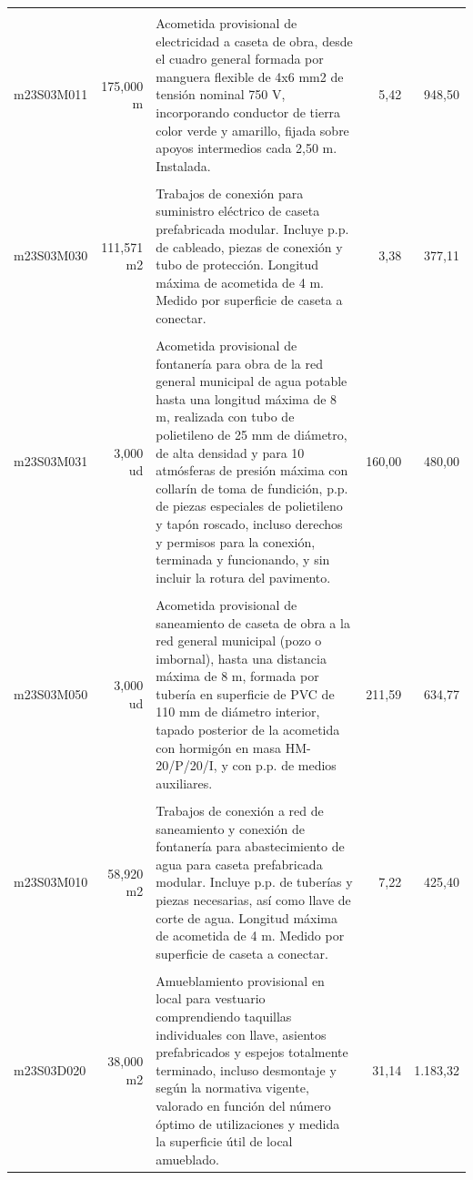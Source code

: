 \documentclass{book}%
\begin{document}
\begin{longtable}{lrlrr}
&&&&\\%
m23S03M011&   175,000 m&\multicolumn{1}{p{5cm}}{Acometida provisional de electricidad a caseta de obra, desde el cuadro general formada por manguera flexible de 4x6 mm2 de tensión nominal 750 V, incorporando conductor de tierra color verde y amarillo, fijada sobre apoyos intermedios cada 2,50 m. Instalada.}&      5,42&948,50\\%
&&&&\\%
m23S03M030&   111,571 m2&\multicolumn{1}{p{5cm}}{Trabajos de conexión para suministro eléctrico de caseta prefabricada modular. Incluye p.p. de cableado, piezas de conexión y tubo de protección. Longitud máxima de acometida de 4 m. Medido por superficie de caseta a conectar.}&      3,38&377,11\\%
&&&&\\%
m23S03M031&     3,000 ud&\multicolumn{1}{p{5cm}}{Acometida provisional de fontanería para obra de la red general municipal de agua potable hasta una longitud máxima de 8 m, realizada con tubo de polietileno de 25 mm de diámetro, de alta densidad y para 10 atmósferas de presión máxima con collarín de toma de fundición, p.p. de piezas especiales de polietileno y tapón roscado, incluso derechos y permisos para la conexión, terminada y funcionando, y sin incluir la rotura del pavimento.}&    160,00&480,00\\%
&&&&\\%
m23S03M050&     3,000 ud&\multicolumn{1}{p{5cm}}{Acometida provisional de saneamiento de caseta de obra a la red general municipal (pozo o imbornal), hasta una distancia máxima de 8 m, formada por tubería en superficie de PVC de 110 mm de diámetro interior, tapado posterior de la acometida con hormigón en masa HM{-}20/P/20/I, y con p.p. de medios auxiliares.}&    211,59&634,77\\%
&&&&\\%
m23S03M010&    58,920 m2&\multicolumn{1}{p{5cm}}{Trabajos de conexión a red de saneamiento y conexión de fontanería para abastecimiento de agua para caseta prefabricada modular. Incluye p.p. de tuberías y piezas necesarias, así como llave de corte de agua. Longitud máxima de acometida de 4 m. Medido por superficie de caseta a conectar.}&      7,22&425,40\\%
&&&&\\%
m23S03D020&    38,000 m2&\multicolumn{1}{p{5cm}}{Amueblamiento provisional en local para vestuario comprendiendo taquillas individuales con llave, asientos prefabricados y espejos totalmente terminado, incluso desmontaje y según la normativa vigente, valorado en función del número óptimo de utilizaciones y medida la superficie útil de local amueblado.}&     31,14&1.183,32\\%

\end{longtable}
\end{document}
